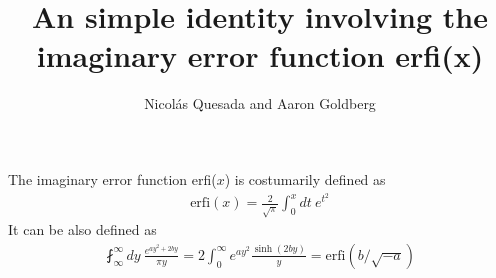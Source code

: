 \documentclass[11pt,letterpaper]{article}
\title{An simple identity involving the imaginary error function erfi(x)}
\author{Nicol\'as Quesada and Aaron Goldberg}
\newcommand{\eq}[1]{\begin{align}#1\end{align}}
\newcommand{\erfi}{\text{erfi}}
\begin{document}
\maketitle
The imaginary error function erfi($x$) is costumarily defined as
\eq{
\erfi(x) = \frac{2}{\sqrt{\pi}} \int_0^x dt \ e^{t^2}
}
It can be also defined as
\eq{
\fint_{\infty}^{\infty} dy\ \frac{e^{a y^2 +2 b y}}{\pi y} = 2\int_0^\infty e^{a y^2}\frac{\sinh(2 b y)}{y}=\erfi(b/\sqrt{-a})
}
\end{document}
